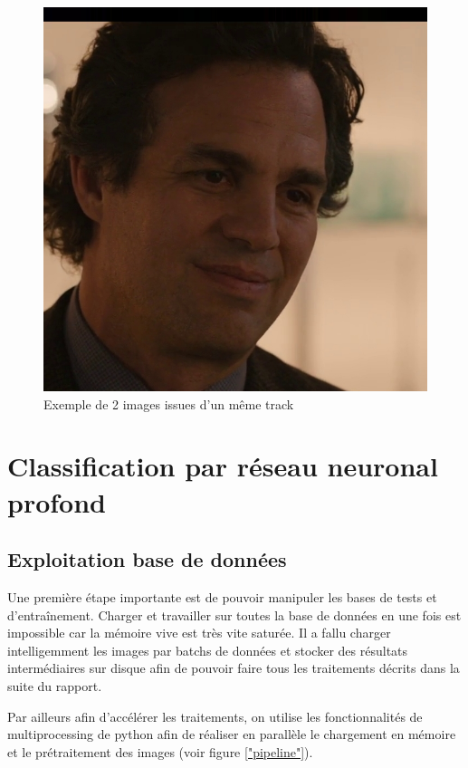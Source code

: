 \documentclass[12pt,french]{report}
\begin{document}
\begin{figure}[h]
\begin{minipage}[t]{.47\linewidth}
\begin{center}
			\includegraphics[width= \textwidth]{image_rapport/277.jpg}
		\end{center}%
	\end{minipage}
	\caption{Exemple de 2 images issues d'un même track}\label{"track"}%
\end{figure}

\chapter{Classification par réseau neuronal profond}

\section{Exploitation base de données}
Une première étape importante est de pouvoir manipuler les bases de tests et d'entraînement.
Charger et travailler sur toutes la base de données en une fois est impossible car la mémoire vive est très vite saturée. Il a fallu charger intelligemment les images par batchs de données et stocker des résultats intermédiaires sur disque afin de pouvoir faire tous les traitements décrits dans la suite du rapport.

Par ailleurs afin d'accélérer les traitements, on utilise les fonctionnalités de multiprocessing de python afin de réaliser en parallèle le chargement en mémoire et le prétraitement des images (voir figure \ref{"pipeline"}).
\end{document}
